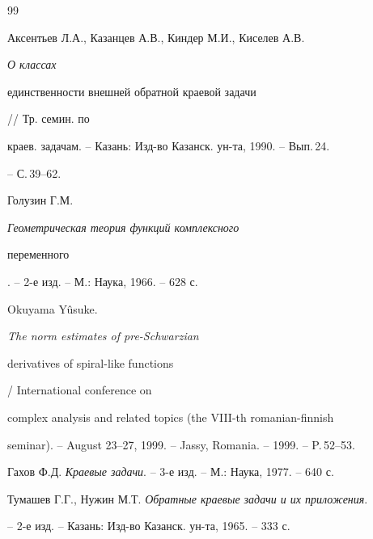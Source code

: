 \begin{thebibliography}{99}


Аксентьев Л.А., Казанцев А.В., Киндер М.И., Киселев А.В. {\em О классах


единственности внешней обратной краевой задачи} // Тр. семин. по


краев. задачам. -- Казань: Изд-во Ка\-занск. ун-та, 1990. -- Вып.\,24.


-- С.\,39--62.







Голузин Г.М. {\em Геометрическая теория функций комплексного


переменного}. -- 2-е изд. -- М.: Наука, 1966. -- 628 с.







Okuyama Y\^{u}suke. {\em The norm estimates of pre-Schwarzian


derivatives of spiral-like functions} / International conference on


complex analysis and related topics (the VIII-th romanian-finnish


seminar). -- August 23--27, 1999. -- Jassy, Romania. -- 1999. -- P.\,52--53.







Гахов Ф.Д. {\em Краевые задачи}. -- 3-е изд. -- М.: Наука, 1977. -- 640 с.







Тумашев Г.Г., Нужин М.Т. {\em Обратные краевые задачи и их приложения}.


-- 2-е изд. -- Казань: Изд-во Казанск. ун-та, 1965. -- 333 с.





\end{thebibliography}





\vskip 2cm












\label{end}









